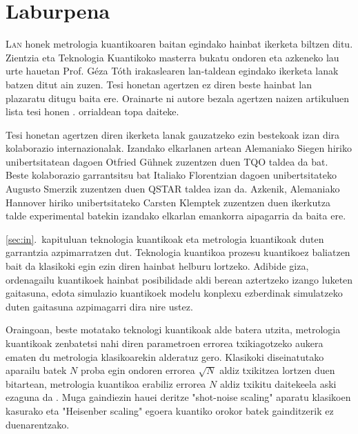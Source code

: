 \section*{Laburpena}
\label{sec:la}


\lettrine[lines=2, findent=3pt,nindent=0pt]{L}{an} honek metrologia kuantikoaren baitan egindako hainbat ikerketa biltzen ditu.
Zientzia eta Teknologia Kuantikoko masterra bukatu ondoren eta azkeneko lau urte hauetan Prof. Géza Tóth irakaslearen lan-taldean egindako ikerketa lanak batzen ditut ain zuzen.
Tesi honetan agertzen ez diren beste hainbat lan plazaratu ditugu baita ere.
Orainarte ni autore bezala agertzen naizen artikuluen lista tesi honen \pageref{sec:pu}. orrialdean topa daiteke.

Tesi honetan agertzen diren ikerketa lanak gauzatzeko ezin bestekoak izan dira kolaborazio internazionalak.
Izandako elkarlanen artean Alemaniako Siegen hiriko unibertsitatean dagoen Otfried Gühnek zuzentzen duen TQO taldea da bat.
Beste kolaborazio garrantsitsu bat Italiako Florentzian dagoen unibertsitateko Augusto Smerzik zuzentzen duen QSTAR taldea izan da.
Azkenik, Alemaniako Hannover hiriko unibertsitateko Carsten Klemptek zuzentzen duen ikerkutza talde experimental batekin izandako elkarlan emankorra aipagarria da baita ere.

\ref{sec:in}.~kapituluan teknologia kuantikoak eta metrologia kuantikoak duten garrantzia azpimarratzen dut.
Teknologia kuantikoa prozesu kuantikoez baliatzen bait da klasikoki egin ezin diren hainbat helburu lortzeko.
Adibide giza, ordenagailu kuantikoek hainbat posibilidade aldi berean aztertzeko izango luketen gaitasuna, edota simulazio kuantikoek modelu konplexu ezberdinak simulatzeko duten gaitasuna azpimagarri dira nire ustez.

Oraingoan, beste motatako teknologi kuantikoak alde batera utzita, metrologia kuantikoak zenbatetsi nahi diren parametroen errorea txikiagotzeko aukera ematen du metrologia klasikoarekin alderatuz gero.
Klasikoki diseinatutako aparailu batek $N$ proba egin ondoren errorea $\sqrt{N}$ aldiz txikitzea lortzen duen bitartean, metrologia kuantikoa erabiliz errorea $N$ aldiz txikitu daitekeela aski ezaguna da \cite{Giovannetti2004, Paris2009}.
Muga gaindiezin hauei deritze "shot-noise scaling" aparatu klasikoen kasurako eta "Heisenber scaling" egoera kuantiko orokor batek gainditzerik ez duenarentzako.

